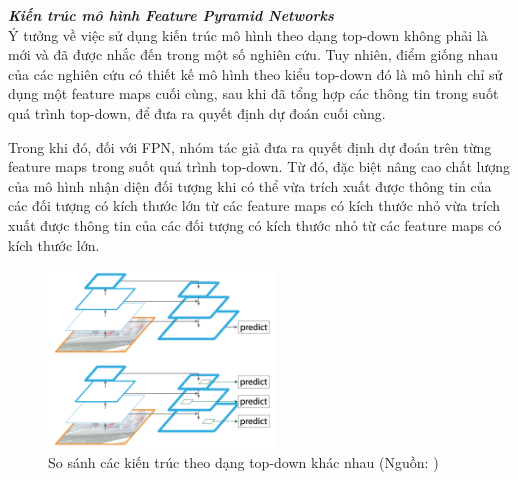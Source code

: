 {    \noindent
    \textbf{\textit{Kiến trúc mô hình Feature Pyramid Networks}} \\
    Ý tưởng về việc sử dụng kiến trúc mô hình theo dạng top-down không phải là mới và đã được nhắc đến trong một số nghiên cứu. Tuy nhiên, điểm giống nhau của các nghiên cứu có thiết kế mô hình theo kiểu top-down đó là mô hình chỉ sử dụng một feature maps  cuối cùng, sau khi đã tổng hợp các thông tin trong suốt quá trình top-down, để đưa ra quyết định dự đoán cuối cùng.

    \noindent
    Trong khi đó, đối với FPN, nhóm tác giả đưa ra quyết định dự đoán trên từng feature maps  trong suốt quá trình top-down. Từ đó, đặc biệt nâng cao chất lượng của mô hình nhận diện đối tượng  khi có thể vừa trích xuất được thông tin của các đối tượng có kích thước lớn từ các feature maps  có kích thước nhỏ vừa trích xuất được thông tin của các đối tượng có kích thước nhỏ từ các feature maps  có kích thước lớn.

    \begin{figure}[H]
        \centering
        \includegraphics[width=6cm] {images/fpn_topdown}
        \caption{So sánh các kiến trúc theo dạng top-down khác nhau (Nguồn: \cite{lin2017feature})}
        \label{fig:fpn_topdown}
    \end{figure}

}
